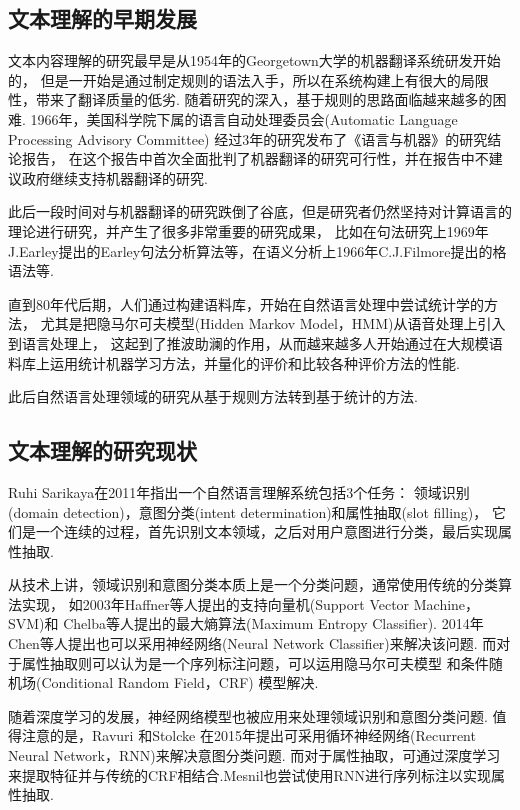 \documentclass[bachelor,adobefonts]{jnuthesis}
\begin{document}
\subsection{文本理解的早期发展}
文本内容理解的研究最早是从1954年的Georgetown大学的机器翻译系统\cite{SlocumMachine}研发开始的，
但是一开始是通过制定规则的语法入手，所以在系统构建上有很大的局限性，带来了翻译质量的低劣.
随着研究的深入，基于规则的思路面临越来越多的困难.
1966年，美国科学院下属的语言自动处理委员会(Automatic Language Processing Advisory Committee)
经过3年的研究发布了《语言与机器》的研究结论报告\cite{Pardelli2008From}，
在这个报告中首次全面批判了机器翻译的研究可行性，并在报告中不建议政府继续支持机器翻译的研究.

此后一段时间对与机器翻译的研究跌倒了谷底，但是研究者仍然坚持对计算语言的理论进行研究，并产生了很多非常重要的研究成果，
比如在句法研究上1969年J.Earley提出的Earley句法分析算法\cite{Earley1970An}等，在语义分析上1966年C.J.Filmore提出的格语法等.


直到80年代后期，人们通过构建语料库，开始在自然语言处理中尝试统计学的方法，
尤其是把隐马尔可夫模型(Hidden Markov Model，HMM)从语音处理上引入到语言处理上，
这起到了推波助澜的作用，从而越来越多人开始通过在大规模语料库上运用统计机器学习方法，并量化的评价和比较各种评价方法的性能.


此后自然语言处理领域的研究从基于规则方法转到基于统计的方法.

\subsection{文本理解的研究现状}
Ruhi Sarikaya在2011年指出一个自然语言理解系统包括3个任务：
领域识别(domain detection)，意图分类(intent determination)和属性抽取(slot filling)\cite{Tur2011Spoken}，
它们是一个连续的过程，首先识别文本领域，之后对用户意图进行分类，最后实现属性抽取.


从技术上讲，领域识别和意图分类本质上是一个分类问题，通常使用传统的分类算法实现，
如2003年Haffner等人\cite{Haffner2003Optimizing,Chelba2003Speech,Chen2015Deriving}提出的支持向量机(Support Vector Machine，SVM)和
Chelba等人\cite{Chen2011Maximum}提出的最大熵算法(Maximum Entropy Classifier).
2014年Chen等人\cite{Ravuri2015Recurrent}提出也可以采用神经网络(Neural Network Classifier)来解决该问题.
而对于属性抽取则可以认为是一个序列标注问题，可以运用隐马尔可夫模型
和条件随机场(Conditional Random Field，CRF) 模型\cite{Pieraccini1992A,Wang2005Spoken}解决.

随着深度学习的发展，神经网络模型也被应用来处理领域识别和意图分类问题.
值得注意的是，Ravuri 和Stolcke 在2015年提出可采用循环神经网络(Recurrent Neural Network，RNN)来解决意图分类问题\cite{Sarikaya2011Deep,Tur2016Towards}.
而对于属性抽取，可通过深度学习来提取特征并与传统的CRF相结合\cite{Xu2014Convolutional}.Mesnil也尝试使用RNN进行序列标注以实现属性抽取\cite{Mesnil2013Investigation}.
\end{document}
